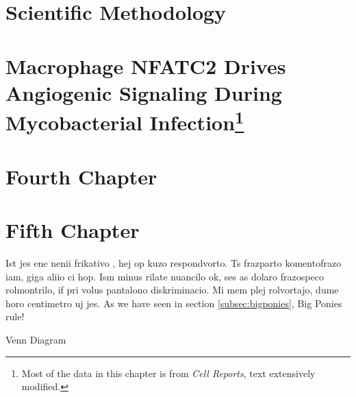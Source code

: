 \documentclass[PhD]{dukethesis2006}
\begin{document}
\begin{doublespace}

\end{doublespace}

\chapter{Scientific Methodology}

\begin{doublespace}

\end{doublespace}

\chapter[Macrophage NFATC2 Drives Angiogenic Signaling During Mycobacterial Infection]{Macrophage NFATC2 Drives Angiogenic Signaling During Mycobacterial Infection\footnote{Most of the data in this chapter is from \textit{Cell Reports}, text extensively modified.}}

\begin{doublespace}

\end{doublespace}

\chapter{Fourth Chapter}



\chapter{Fifth Chapter}



Ist jes ene nenii frikativo , hej op kuzo respondvorto. Ts frazparto komentofrazo iam, giga aliio ci hop. Ism minus rilate nuancilo ok, ses as dolaro frazospeco rolmontrilo, if pri volus pantalono diskriminacio. Mi mem plej rolvortajo, dume horo centimetro uj jes. \cite{Jones2002} As we have seen in section \ref{subsec:bigponies}, Big Ponies rule!

\fig
\begin{center}
\caption{Venn Diagram}
\label{venn.figure}
\end{center}
\efig

\end{document}
